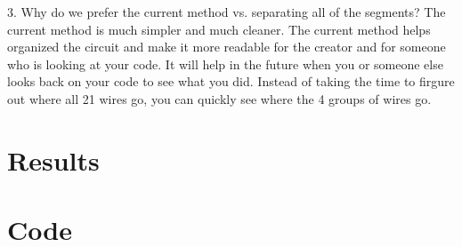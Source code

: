 \documentclass[11pt]{article}
\begin{document}
3. Why do we prefer the current method vs. separating all of the segments? \newline
The current method is much simpler and much cleaner. The current method helps organized the circuit and make it more readable for the creator and for someone who is looking at your code. It will help in the future when you or someone else looks back on your code to see what you did. Instead of taking the time to firgure out where all 21 wires go, you can quickly see where the 4 groups of wires go. 


\section*{Results}






\section*{Code}
\end{document}
